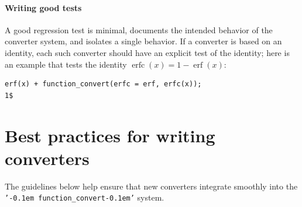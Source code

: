 \documentclass[12pt,fleqn]{extarticle}
\newcommand{\ttq}[1]{\texttt{'\kern-0.1em #1\kern-0.1em'}}
\newcommand{\funconvert}{\ttq{function\_convert}{ }}
\newenvironment{maximabox}
  {\begin{tcolorbox}[
      breakable,
      enhanced,
      colback=white,
      colframe=black!8,
      boxrule=0pt,
      borderline west={2.2pt}{0pt}{black!25},
      arc=1pt,
      left=11pt,
      right=7pt,
      top=9pt,
      bottom=9pt,
      before skip=14pt,
      after skip=14pt
    ]}
  {\end{tcolorbox}}
\DeclareMathOperator{\erf}{erf}
\DeclareMathOperator{\erfc}{erfc}
\begin{document}
\paragraph{Writing good tests} A good regression test is minimal, documents the intended behavior of the converter system, and  isolates a single behavior. If a converter is based on an identity, each such converter should have an explicit test of the identity; here is an example that tests the identity 
$\erfc(x) = 1-\erf(x)$:
\begin{maximabox}
\begin{verbatim}
erf(x) + function_convert(erfc = erf, erfc(x));
1$
\end{verbatim}
\end{maximabox}

\section{Best practices for writing converters}

 The guidelines below help ensure that new converters integrate smoothly into
the \funconvert system.
\end{document}
